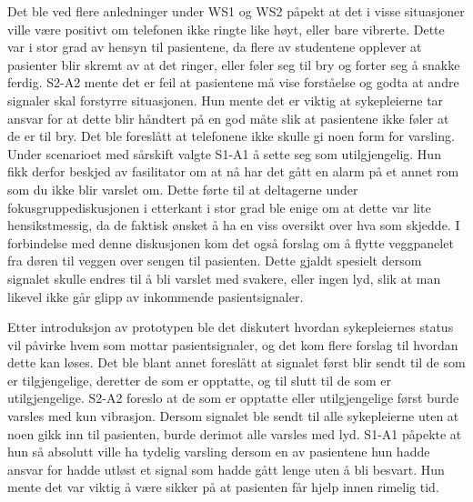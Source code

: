 \noindent
Det ble ved flere anledninger under WS1 og WS2 påpekt at det i visse situasjoner ville være positivt om telefonen ikke ringte like høyt, eller bare vibrerte. Dette var i stor grad av hensyn til pasientene, da flere av studentene opplever at pasienter blir skremt av at det ringer, eller føler seg til bry og forter seg å snakke ferdig. 
S2-A2 mente det er feil at pasientene må vise forståelse og godta at andre signaler skal forstyrre situasjonen. Hun mente det er viktig at sykepleierne tar ansvar for at dette blir håndtert på en god måte slik at pasientene ikke føler at de er til bry. Det ble foreslått at telefonene ikke skulle gi noen form for varsling. Under scenarioet med sårskift valgte S1-A1 å sette seg som utilgjengelig. Hun fikk derfor beskjed av fasilitator om at nå har det gått en alarm på et annet rom som du ikke blir varslet om. Dette førte til at deltagerne under fokusgruppediskusjonen i etterkant i stor grad ble enige om at dette var lite hensikstmessig, da de faktisk ønsket å ha en viss oversikt over hva som skjedde. I forbindelse med denne diskusjonen kom det også forslag om å flytte veggpanelet fra døren til veggen over sengen til pasienten. Dette gjaldt spesielt dersom signalet skulle endres til å bli varslet med svakere, eller ingen lyd, slik at man likevel ikke går glipp av inkommende pasientsignaler.

\noindent
Etter introduksjon av prototypen ble det diskutert hvordan sykepleiernes status vil påvirke hvem som mottar pasientsignaler, og det kom flere forslag til hvordan dette kan løses. Det ble blant annet foreslått at signalet først blir sendt til de som er tilgjengelige, deretter de som er opptatte, og til slutt til de som er utilgjengelige. S2-A2 foreslo at de som er opptatte eller utilgjengelige først burde varsles med kun vibrasjon. Dersom signalet ble sendt til alle sykepleierne uten at noen gikk inn til pasienten, burde derimot alle varsles med lyd. S1-A1 påpekte at hun så absolutt ville ha tydelig varsling dersom en av pasientene hun hadde ansvar for hadde utløst et signal som hadde gått lenge uten å bli besvart. Hun mente det var viktig å være sikker på at pasienten får hjelp innen rimelig tid. 